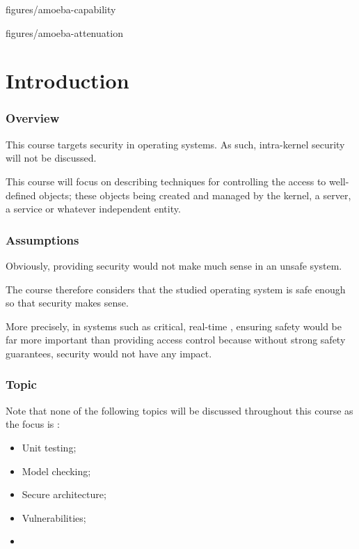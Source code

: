 %
%

                {figures/amoeba-capability}

                {figures/amoeba-attenuation}

%
%

%
%

\section{Introduction}


\begin{frame}
  \frametitle{Overview}

  This course targets security in operating systems. As such, intra-kernel
  security will not be discussed.

  \-

  This course will focus on describing techniques for controlling the access to
  well-defined objects; these objects being created and managed by the kernel,
  a server, a service or whatever independent entity.
\end{frame}


\begin{frame}
  \frametitle{Assumptions}

  Obviously, providing security would not make much sense in an unsafe
  system.

  \-

  The course therefore considers that the studied operating system
  is safe enough so that security makes sense.

  \-

  More precisely, in systems such as critical, real-time \etc{},
  ensuring safety would be far more important than providing access control
  because without strong safety guarantees, security would not have any impact.
\end{frame}


\begin{frame}
  \frametitle{Topic}

  Note that none of the following topics will be discussed throughout this
  course as the focus is :

  \-

  \begin{itemize}
    \item
      Unit testing;
    \item
      Model checking;
    \item
      Secure architecture;
    \item
      Vulnerabilities;
    \item
      \etc{}
  \end{itemize}
\end{frame}

